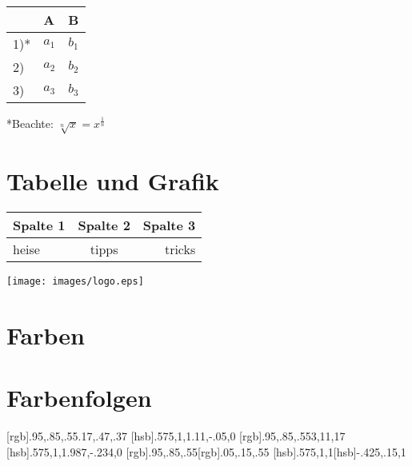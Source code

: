     \begin{multicols}{2}
        \begin{tabular}[h]{ll|l}
            &  A     & B     \\ 
        \hline
        1)* &  $a_1$ & $b_1$ \\
        2)  &  $a_2$ & $b_2$ \\
        3)  &  $a_3$ & $b_3$ 
        \end{tabular}
        
        \columnbreak%
        *Beachte: $\sqrt[n]{x} = x^\frac{1}{n}$       
    \end{multicols}

\section{Tabelle und Grafik}
    \begin{multicols}{2}
        \begin{tabular}[h]{l|c|r}
            Spalte 1 & Spalte 2 & Spalte 3 \\
            \hline
            heise & tipps & tricks \\
        \end{tabular}    

        \columnbreak%

        \texttt{[image: images/logo.eps]}%
    \end{multicols}  

\newpage
\section{Farben}
    \begin{testcolors}
    \end{testcolors}
    
\section{Farbenfolgen}
    [rgb]{.95,.85,.55}{.17,.47,.37}
    [hsb]{.575,1,1}{.11,-.05,0}
    [rgb]{.95,.85,.55}{3,11,17}
    [hsb]{.575,1,1}{.987,-.234,0}
    [rgb]{.95,.85,.55}[rgb]{.05,.15,.55}
    [hsb]{.575,1,1}[hsb]{-.425,.15,1}

